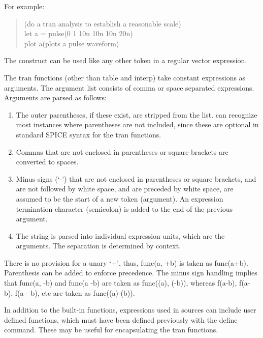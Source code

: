 For example:
\begin{quote}
(do a tran analysis to establish a reasonable scale)\\
{\vt let a = pulse(0 1 10n 10n 10n 20n)}\\
{\vt plot a}\hspace{1cm}(plots a pulse waveform)\\
\end{quote}
The construct can be used like any other token in a regular vector
expression.

The tran functions (other than {\vt table} and {\vt interp}) take
constant expressions as arguments.  The argument list consists of
comma or space separated expressions.  Arguments are parsed as
follows:

\begin{enumerate}
\item{The outer parentheses, if these exist, are stripped from the list.
     {\WRspice} can recognize most instances where parentheses are not
     included, since these are optional in standard SPICE syntax for the
     tran functions.}
\item{Commas that are not enclosed in parentheses or square brackets are
     converted to spaces.}
\item{Minus signs (`{\vt -}') that are not enclosed in parentheses or square
      brackets, and are not followed by white space, and are preceded
      by white space, are assumed to be the start of a new token
      (argument).  An expression termination character (semicolon) is
      added to the end of the previous argument.}
\item{The string is parsed into individual expression units, which are
      the arguments.  The separation is determined by context.}
\end{enumerate}

There is no provision for a unary `{\vt +}', thus, {\vt func(a, +b)} is
taken as {\vt func(a+b)}.  Parenthesis can be added to enforce
precedence.  The minus sign handling implies that {\vt func(a, -b)} and
{\vt func(a -b)} are taken as {\vt func((a), (-b))}, whereas
{\vt f(a-b), f(a- b), f(a - b)}, etc are taken as {\vt func((a)-(b))}.

In addition to the built-in functions, expressions used in sources can
include user defined functions, which must have been defined
previously with the {\cb define} command.  These may be useful for
encapsulating the tran functions.


